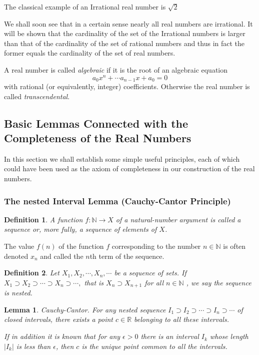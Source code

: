 \documentclass[a4paper,12pt]{article} %
\newtheorem{definition}{Definition}[section]
\newtheorem{lemma}[theorem]{Lemma}
\begin{document}
The classical example of an Irrational real number is $\sqrt{2}$

We shall soon see that in a certain sense nearly all real numbers 
are irrational. It will be shown that the cardinality of the set 
of the Irrational numbers is larger than that of the cardinality 
of the set of rational numbers and thus in fact the former equals
the cardinality of the set of real numbers.

A real number is called \textit{algebraic} if it is the root of an algebraic 
equation \[a_0 x^n+\cdots a_{n-1}x+a_0=0\]
with rational (or equivalently, integer) coefficients. Otherwise the 
real number is called \textit{transcendental}.

\subsection{Basic Lemmas Connected with the Completeness of the Real Numbers}
In this section we shall establish some simple useful principles, each of 
which could have been used as the axiom of completeness in our construction
of the real numbers.

\subsubsection{The nested Interval Lemma (Cauchy-Cantor Principle)}
\begin{definition}
    A function $f:\mathbb{N}\to X$ of a natural-number argument is called
    a sequence or, more fully, a sequence of elements of $X$.
\end{definition}

The value $f(n)$ of the function $f$ corresponding to the number 
$n\in\mathbb{N}$ is often denoted $x_n$ and called the $n$th term of 
the sequence.

\begin{definition}
    Let $X_1,X_2,\cdots,X_n,\cdots$ be a sequence of sets. If $X_1\supset X_2\supset 
    \cdots\supset X_n \supset \cdots,$ that is $X_n \supset X_{n+1}$ for all $n\in \mathbb{N}$
    , we say the sequence is nested.
\end{definition}

\begin{lemma}{Cauchy-Cantor.}
    For any nested sequence $I_1 \supset I_2 \supset \cdots \supset I_n  \supset \cdots$
    of closed intervals, there exists a point $c\in \mathbb{R}$
    belonging to all these intervals.

    If in addition it is known that for any $\epsilon >0  $
    there is an interval $I_k$ whose length $|I_k|$
    is less than $\epsilon$, then $c$ is the unique point common to all
    the intervals.
\end{lemma}
\end{document}
